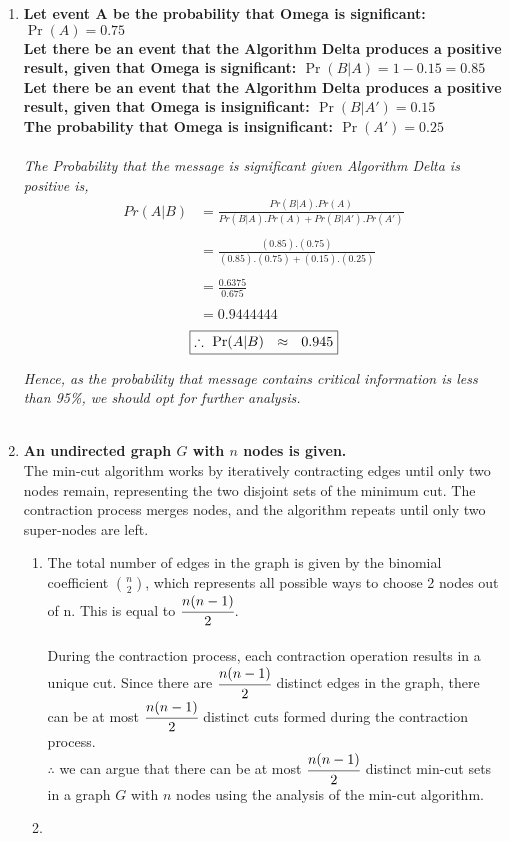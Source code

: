 \documentclass{article}
\begin{document}
\begin{enumerate}
\item
  \textbf{Let event A be the probability that Omega is significant: $\Pr(A) = 0.75$}\\
  \textbf{Let there be an event that the Algorithm Delta produces a positive result, given that Omega is significant: $\Pr(B|A) = 1-0.15 = 0.85$}\\
  \textbf{Let there be an event that the Algorithm Delta produces a positive result, given that Omega is insignificant: $\Pr(B|A') = 0.15$}\\
  \textbf{The probability that Omega is insignificant: $\Pr(A') = 0.25$}\\\\
  \textit{The Probability that the message is significant given Algorithm Delta is positive is,}
  \begin{align*}
    Pr(A|B) &= \frac{Pr(B|A).Pr(A)}{Pr(B|A).Pr(A) + Pr(B|A').Pr(A')}\\\\
    &= \frac{(0.85). (0.75)}{(0.85). (0.75) + (0.15). (0.25)}\\\\
    &= \frac{0.6375}{0.675}\\\\
    &= 0.9444444
  \end{align*}
  \[
     \boxed{\therefore\ \Pr(A|B )\ \ \approx \ \ 0.945}\\
  \]

  \textit{Hence, as the probability that message contains critical information is less than 95\%, we should opt for further analysis.}\\\\

\newpage
\item \textbf{An undirected graph $G$ with $n$ nodes is given.}\\
  \textnormal{The min-cut algorithm works by iteratively contracting edges until only two nodes remain, representing the two disjoint sets of the minimum cut. The contraction process merges nodes, and the algorithm repeats until only two super-nodes are left.}\\
  \begin{enumerate}
    \item \textnormal{The total number of edges in the graph is given by the binomial coefficient \( \binom{n}{2} \), which represents all possible ways to choose 2 nodes out of n. This is equal to \(\cfrac{n(n-1)}{2}\).}\\\\
    \textnormal{During the contraction process, each contraction operation results in a unique cut. Since there are \(\cfrac{n(n-1)}{2}\) distinct edges in the graph, there can be at most \(\cfrac{n(n-1)}{2}\) distinct cuts formed during the contraction process.}\\
    \(\therefore\)  we can argue that there can be at most \(\cfrac{n(n-1)}{2}\) distinct min-cut sets in a graph $G$ with $n$ nodes using the analysis of the min-cut algorithm.\\
    \item 
  \end{enumerate}


\end{enumerate}
\end{document}
